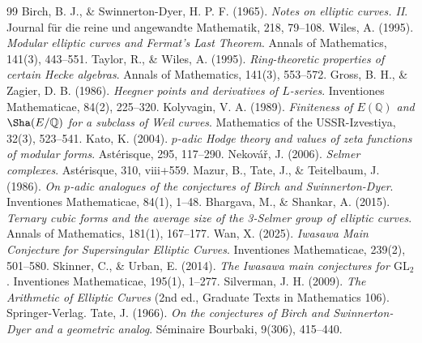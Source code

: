 \documentclass[11pt,a4paper]{article}
\theoremstyle{definition}
\begin{document}
\newpage
\begin{thebibliography}{99}
 Birch, B. J., \& Swinnerton-Dyer, H. P. F. (1965). \textit{Notes on elliptic curves. II}. Journal für die reine und angewandte Mathematik, 218, 79--108.
 Wiles, A. (1995). \textit{Modular elliptic curves and Fermat's Last Theorem}. Annals of Mathematics, 141(3), 443--551.
 Taylor, R., \& Wiles, A. (1995). \textit{Ring-theoretic properties of certain Hecke algebras}. Annals of Mathematics, 141(3), 553--572.
 Gross, B. H., \& Zagier, D. B. (1986). \textit{Heegner points and derivatives of $L$-series}. Inventiones Mathematicae, 84(2), 225--320.
 Kolyvagin, V. A. (1989). \textit{Finiteness of $E(\mathbb{Q})$ and $\Sha(E/\mathbb{Q})$ for a subclass of Weil curves}. Mathematics of the USSR-Izvestiya, 32(3), 523--541.
 Kato, K. (2004). \textit{$p$-adic Hodge theory and values of zeta functions of modular forms}. Astérisque, 295, 117--290.
 Nekov\'a\v{r}, J. (2006). \textit{Selmer complexes}. Astérisque, 310, viii+559.
 Mazur, B., Tate, J., \& Teitelbaum, J. (1986). \textit{On $p$-adic analogues of the conjectures of Birch and Swinnerton-Dyer}. Inventiones Mathematicae, 84(1), 1--48.
 Bhargava, M., \& Shankar, A. (2015). \textit{Ternary cubic forms and the average size of the 3-Selmer group of elliptic curves}. Annals of Mathematics, 181(1), 167--177.
 Wan, X. (2025). \textit{Iwasawa Main Conjecture for Supersingular Elliptic Curves}. Inventiones Mathematicae, 239(2), 501--580.
 Skinner, C., \& Urban, E. (2014). \textit{The Iwasawa main conjectures for $\mathrm{GL}_2$}. Inventiones Mathematicae, 195(1), 1--277.
 Silverman, J. H. (2009). \textit{The Arithmetic of Elliptic Curves} (2nd ed., Graduate Texts in Mathematics 106). Springer-Verlag.
 Tate, J. (1966). \textit{On the conjectures of Birch and Swinnerton-Dyer and a geometric analog}. Séminaire Bourbaki, 9(306), 415--440.
\end{thebibliography}
\end{document}
